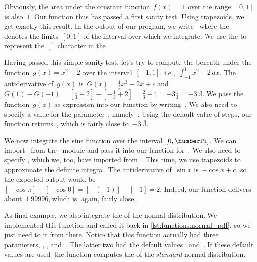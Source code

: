 Obviously, the area under the constant function~$f(x)=1$ over the range~$[0,1]$ is also~$1$.
Our function  thus has passed a first sanity test.
Using  trapezoids, we get exactly this result.
In the output of our program, we write~ where the~ denotes the limits~$[0,1]$ of the interval over which we integrate.
We use the    to represent the~$\int$~character in the .

Having passed this simple sanity test, let's try to compute the beneath under the function~$g(x)=x^2-2$ over the interval~$[-1,1]$, i.e.,~$\int_{-1}^1 x^2-2\,dx$.
The antiderivative of~$g(x)$ is~$G(x)=\frac{1}{3}x^3-2x+c$ and $G(1)-G(-1)=[\frac{1}{3}-2]-[-\frac{1}{3}+2]=\frac{2}{3}-4=-3\frac{1}{3}=-3.\overline{3}$.
We pass the function~$g(x)$ as  expression into our  function by writing~.
We also need to specify a value for the parameter~, namely~.
Using the default value of  steps, our function returns~, which is fairly close to~$-3.\overline{3}$.

We now integrate the sine function over the interval~$[0,\numberPi]$.
We can import~ from the ~module and pass it into our function for~.
We also need to specify , which we, too, have imported from~.
This time, we use  trapezoids to approximate the definite integral.
The antiderivative of~$\sin x$ is~$-\cos x+c$, so the expected output would be~$[-\cos\pi]-[-\cos 0]=[-(-1)]-[-1]=2$.
Indeed, our function delivers about~$1.99996$, which is, again, fairly close.

As final example, we also integrate the  of the normal distribution.
We implemented this function and called it  back in \cref{lst:functions:normal_pdf}, so we just need to  it from there.
Notice that this function actually had three parameters, , , and~.
The latter two had the default values~ and~.
If these default values are used, the function computes the  of the \emph{standard} normal distribution.

%

